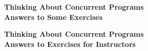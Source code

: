 \cleardoublepage
\pagestyle{plain}
\begin{center}
\Large\bf
Thinking About Concurrent Programs \\
\large
Answers to Some Exercises
\end{center}


\showallanswersS


\cleardoublepage
{}
\begin{center}
\Large\bf
Thinking About Concurrent Programs \\
\large
Answers to  Exercises for Instructors
\end{center}


\showallanswersI
